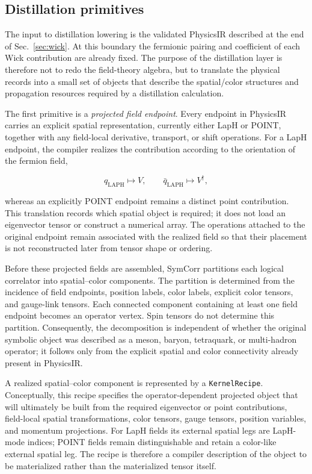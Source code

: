 \documentclass[11pt]{article}
\begin{document}
\subsection{Distillation primitives}

The input to distillation lowering is the validated PhysicsIR described at the
end of Sec.~\ref{sec:wick}. At this boundary the fermionic pairing and
coefficient of each Wick contribution are already fixed. The purpose of the
distillation layer is therefore not to redo the field-theory algebra, but to
translate the physical records into a small set of objects that describe the
spatial/color structures and propagation resources required by a distillation
calculation.

The first primitive is a \emph{projected field endpoint}. Every endpoint in
PhysicsIR carries an explicit spatial representation, currently either LapH or
POINT, together with any field-local derivative, transport, or shift operations.
For a LapH endpoint, the compiler realizes the contribution according to the
orientation of the fermion field,

\begin{equation}
q_{\mathrm{LAPH}} \longmapsto V,
\qquad
\bar q_{\mathrm{LAPH}} \longmapsto V^\dagger,
\label{eq:laph_endpoint_realization}
\end{equation}

whereas an explicitly POINT endpoint remains a distinct point contribution.
This translation records which spatial object is required; it does not load an
eigenvector tensor or construct a numerical array. The operations attached to
the original endpoint remain associated with the realized field so that their
placement is not reconstructed later from tensor shape or ordering.

Before these projected fields are assembled, SymCorr partitions each logical
correlator into spatial--color components. The partition is determined from the
incidence of field endpoints, position labels, color labels, explicit color
tensors, and gauge-link tensors. Each connected component containing at least
one field endpoint becomes an operator vertex. Spin tensors do not determine
this partition. Consequently, the decomposition is independent of whether the
original symbolic object was described as a meson, baryon, tetraquark, or
multi-hadron operator; it follows only from the explicit spatial and color
connectivity already present in PhysicsIR.

A realized spatial--color component is represented by a \texttt{KernelRecipe}.
Conceptually, this recipe specifies the operator-dependent projected object that
will ultimately be built from the required eigenvector or point contributions,
field-local spatial transformations, color tensors, gauge tensors, position
variables, and momentum projections. For LapH fields its external spatial legs
are LapH-mode indices; POINT fields remain distinguishable and retain a
color-like external spatial leg. The recipe is therefore a compiler description
of the object to be materialized rather than the materialized tensor itself.
\end{document}
